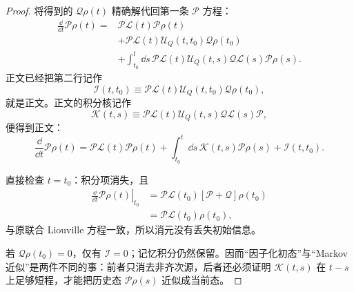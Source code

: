 \begin{proof}
将得到的 $\mathcal Q\rho(t)$ 精确解代回第一条 $\mathcal P$ 方程：
\begin{align*}
 \frac{\dd}{\dd t}\mathcal P\rho(t)
 ={}&\mathcal P\mathcal L(t)\mathcal P\rho(t)\\
 &+\mathcal P\mathcal L(t)
 \mathcal U_Q(t,t_0)\mathcal Q\rho(t_0)\\
 &+\int_{t_0}^{t}\dd s\,
 \mathcal P\mathcal L(t)
 \mathcal U_Q(t,s)
 \mathcal Q\mathcal L(s)\mathcal P\rho(s).
\end{align*}
正文已经把第二行记作
\begin{equation*}
 \mathcal I(t,t_0)
 \equiv
 \mathcal P\mathcal L(t)
 \mathcal U_Q(t,t_0)\mathcal Q\rho(t_0),
\end{equation*}
就是正文。正文的积分核记作
\begin{equation*}
 \mathcal K(t,s)
 \equiv
 \mathcal P\mathcal L(t)
 \mathcal U_Q(t,s)
 \mathcal Q\mathcal L(s)\mathcal P,
\end{equation*}
便得到正文：
\begin{equation*}
 \frac{\dd}{\dd t}\mathcal P\rho(t)
 =\mathcal P\mathcal L(t)\mathcal P\rho(t)
 +\int_{t_0}^{t}\dd s\,
 \mathcal K(t,s)\mathcal P\rho(s)
 +\mathcal I(t,t_0).
\end{equation*}

直接检查 $t=t_0$：积分项消失，且
\begin{align*}
 \left.\frac{\dd}{\dd t}\mathcal P\rho(t)\right|_{t_0}
 &=\mathcal P\mathcal L(t_0)
 \left[\mathcal P+\mathcal Q\right]\rho(t_0)\\
 &=\mathcal P\mathcal L(t_0)\rho(t_0),
\end{align*}
与原联合 Liouville 方程一致，所以消元没有丢失初始信息。

若 $\mathcal Q\rho(t_0)=0$，仅有 $\mathcal I=0$；记忆积分仍然保留。因而“因子化初态”与“Markov 近似”是两件不同的事：前者只消去非齐次源，后者还必须证明 $\mathcal K(t,s)$ 在 $t-s$ 上足够短程，才能把历史态 $\mathcal P\rho(s)$ 近似成当前态。
\end{proof}


